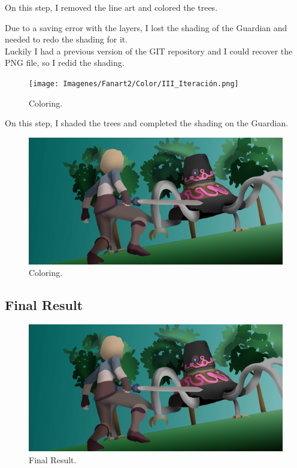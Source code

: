 \documentclass{cup-pan}
\begin{document}
        On this step, I removed the line art and colored the trees.

        Due to a saving error with the layers, I lost the shading of the Guardian and needed to redo the shading for it.\\

        Luckily I had a previous version of the GIT repository and I could recover the PNG file, so I redid the shading.\\
        \begin{figure}[H]
            \texttt{[image: Imagenes/Fanart2/Color/III\_Iteración.png]}
            \caption{Coloring.}
        \end{figure}

        On this step, I shaded the trees and completed the shading on the Guardian.\\
        \begin{figure}[H]
            \includegraphics[width=\textwidth]{Imagenes/Fanart2/Color/IIII_Iteracion.png}
            \caption{Coloring.}
        \end{figure}

    \subsection{Final Result}

        \begin{figure}[H]
            \includegraphics[width=\textwidth]{Imagenes/Fanart2/Color/IIII_Iteracion.png}
            \caption{Final Result.}
        \end{figure}
\end{document}
